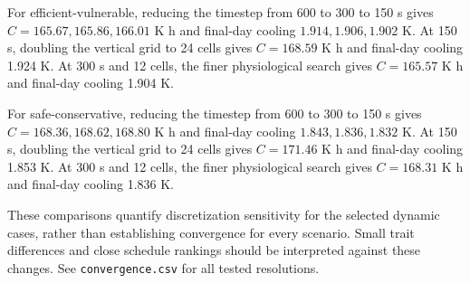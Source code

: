 For efficient-vulnerable, reducing the timestep from 600 to 300 to 150 s gives $C=165.67, 165.86, 166.01$ K h and final-day cooling $1.914, 1.906, 1.902$ K. At 150 s, doubling the vertical grid to 24 cells gives $C=168.59$ K h and final-day cooling 1.924 K. At 300 s and 12 cells, the finer physiological search gives $C=165.57$ K h and final-day cooling 1.904 K.

For safe-conservative, reducing the timestep from 600 to 300 to 150 s gives $C=168.36, 168.62, 168.80$ K h and final-day cooling $1.843, 1.836, 1.832$ K. At 150 s, doubling the vertical grid to 24 cells gives $C=171.46$ K h and final-day cooling 1.853 K. At 300 s and 12 cells, the finer physiological search gives $C=168.31$ K h and final-day cooling 1.836 K.

These comparisons quantify discretization sensitivity for the selected dynamic cases, rather than establishing convergence for every scenario. Small trait differences and close schedule rankings should be interpreted against these changes. See \texttt{convergence.csv} for all tested resolutions.
